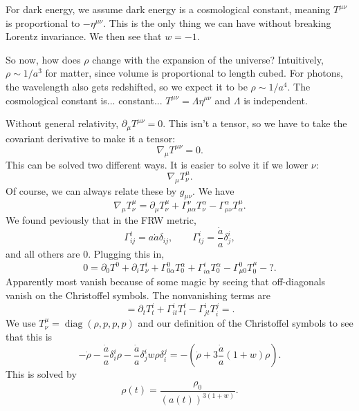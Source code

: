 For dark energy, we assume dark energy is a cosmological constant, meaning $T^{\mu \nu } $ is proportional to $-\eta ^{\mu \nu } $. This is the only thing we can have without breaking Lorentz invariance. We then see that $w=-1$.

So now, how does $\rho $ change with the expansion of the universe? Intuitively, $\rho \sim 1/a^3$ for matter, since volume is proportional to length cubed. For photons, the wavelength also gets redshifted, so we expect it to be $\rho \sim 1/a^4$. The cosmological constant is... constant... $T^{\mu \nu }=\Lambda \eta ^{\mu \nu } $ and $\Lambda $ is independent.

Without general relativity, $\partial _\mu T^{\mu \nu } =0$. This isn't a tensor, so we have to take the covariant derivative to make it a tensor:
\[
	\nabla _\mu T^{\mu \nu } =0
.\]
This can be solved two different ways. It is easier to solve it if we lower $\nu $:
\[
	\nabla _\mu T^\mu _\nu 
.\]
Of course, we can always relate these by $g_{\mu \nu } $. We have
\[
	\nabla _\mu T^\mu _\nu =\partial _\mu T^\mu _\nu +\Gamma _{\mu \alpha } ^\nu T_\nu ^\alpha -\Gamma _{\mu \nu } ^\alpha T^\mu _\alpha 
.\]
We found peviously that in the FRW metric,
\[
	\Gamma ^t_{ij} =a \dot{a} \delta _{ij} ,\qquad \Gamma _{tj} ^i=\frac{\dot{a} }{a} \delta _j^i
,\]
and all others are 0. Plugging this in,
\[
	0=\partial _0T^0+\partial _iT^i_\nu +\Gamma^0_{0\alpha } T^\alpha _0 +\Gamma_{i\alpha } ^iT^\alpha _0 -\Gamma ^0_{\mu 0} T^\mu _0-?
.\]
Apparently most vanish because of some magic by seeing that off-diagonals vanish on the Christoffel symbols. The nonvanishing terms are
\[
	=\partial _tT^i_t+\Gamma _{it} ^iT_t^t-\Gamma^i_{jt} T_i^j=
.\]
We use $T^\mu _\nu =\operatorname{diag} (\rho ,p,p,p)$ and our definition of the Christoffel symbols to see that this is
\[
	-\dot{\rho } -\frac{\dot{a} }{a} \delta _i^i\rho -\frac{\dot{a} }{a} \delta _j^iw\rho \delta _i^j=-\left( \dot{\rho } +3\frac{\dot{a} }{a} (1+w)\rho  \right) 
.\]
This is solved by
\[
	\rho (t)=\frac{\rho _0}{(a(t))^{3(1+w)} } 
.\]

